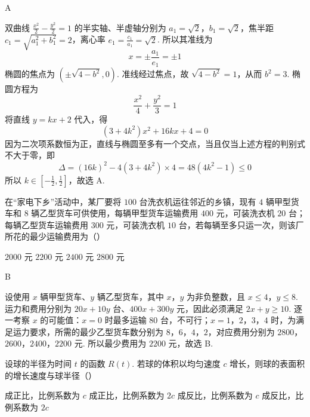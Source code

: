 \begin{answer}
A
\end{answer}

\begin{solution}
双曲线 \(\frac{x^2}{2}-\frac{y^2}{2}=1\) 的半实轴、半虚轴分别为 \(a_1=\sqrt2\)，\(b_1=\sqrt2\)，焦半距 \(c_1=\sqrt{a_1^2+b_1^2}=2\)，离心率 \(e_1=\frac{c_1}{a_1}=\sqrt2\). 所以其准线为
\[
x=\pm\frac{a_1}{e_1}=\pm1
\]
椭圆的焦点为 \((\pm\sqrt{4-b^2},0)\). 准线经过焦点，故 \(\sqrt{4-b^2}=1\)，从而 \(b^2=3\). 椭圆方程为
\[
\frac{x^2}{4}+\frac{y^2}{3}=1
\]
将直线 \(y=kx+2\) 代入，得
\[
(3+4k^2)x^2+16kx+4=0
\]
因为二次项系数恒为正，直线与椭圆至多有一个交点，当且仅当上述方程的判别式不大于零，即
\[
\Delta=(16k)^2-4(3+4k^2)\times4=48(4k^2-1)\leqslant0
\]
所以 \(k\in[-\frac12,\frac12]\)，故选 A.
\end{solution}

\begin{problem}
在“家电下乡”活动中，某厂要将 \(100\text{ 台}\)洗衣机运往邻近的乡镇，现有 \(4\text{ 辆}\)甲型货车和 \(8\text{ 辆}\)乙型货车可供使用，每辆甲型货车运输费用 \(400\text{ 元}\)，可装洗衣机 \(20\text{ 台}\)；每辆乙型货车运输费用 \(300\text{ 元}\)，可装洗衣机 \(10\text{ 台}\)，若每辆至多只运一次，则该厂所花的最少运输费用为（\quad）

\choices
    {\(2000\text{ 元}\)}
    {\(2200\text{ 元}\)}
    {\(2400\text{ 元}\)}
    {\(2800\text{ 元}\)}
\end{problem}

\begin{answer}
B
\end{answer}

\begin{solution}
设使用 \(x\) 辆甲型货车、\(y\) 辆乙型货车，其中 \(x\)，\(y\) 为非负整数，且 \(x\leqslant4\)，\(y\leqslant8\). 运力和费用分别为 \(20x+10y\) 台、\(400x+300y\) 元，因此必须满足 \(2x+y\geqslant10\). 逐一考察 \(x\) 的可能值：\(x=0\) 时最多运输 \(80\) 台，不可行；\(x=1\)，\(2\)，\(3\)，\(4\) 时，为满足运力要求，所需的最少乙型货车数分别为 \(8\)，\(6\)，\(4\)，\(2\)，对应费用分别为 \(2800\)，\(2600\)，\(2400\)，\(2200\) 元. 所以最少费用为 \(2200\) 元，故选 B.
\end{solution}

\begin{problem}
设球的半径为时间 \(t\) 的函数 \(R(t)\). 若球的体积以均匀速度 \(c\) 增长，则球的表面积的增长速度与球半径（\quad）

\choices
    {成正比，比例系数为 \(c\)}
    {成正比，比例系数为 \(2c\)}
    {成反比，比例系数为 \(c\)}
    {成反比，比例系数为 \(2c\)}
\end{problem}

